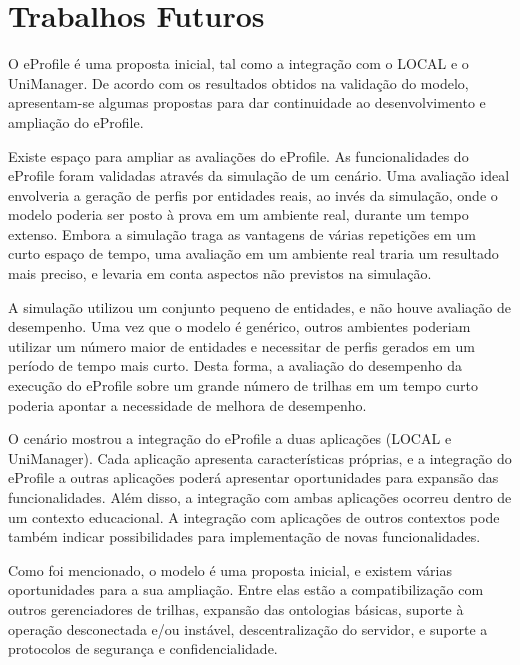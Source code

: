 \section{Trabalhos Futuros}

O eProfile é uma proposta inicial, tal como a integração com o LOCAL e o UniManager. De acordo com os resultados obtidos na validação do modelo, apresentam-se algumas propostas para dar continuidade ao desenvolvimento e ampliação do eProfile.

Existe espaço para ampliar as avaliações do eProfile. As funcionalidades do eProfile foram validadas através da simulação de um cenário. Uma avaliação ideal envolveria a geração de perfis por entidades reais, ao invés da simulação, onde o modelo poderia ser posto à prova em um ambiente real, durante um tempo extenso. Embora a simulação traga as vantagens de várias repetições em um curto espaço de tempo, uma avaliação em um ambiente real traria um resultado mais preciso, e levaria em conta aspectos não previstos na simulação.

A simulação utilizou um conjunto pequeno de entidades, e não houve avaliação de desempenho. Uma vez que o modelo é genérico, outros ambientes poderiam utilizar um número maior de entidades e necessitar de perfis gerados em um período de tempo mais curto. Desta forma, a avaliação do desempenho da execução do eProfile sobre um grande número de trilhas em um tempo curto poderia apontar a necessidade de melhora de desempenho.

O cenário mostrou a integração do eProfile a duas aplicações (LOCAL e UniManager). Cada aplicação apresenta características próprias, e a integração do eProfile a outras aplicações poderá apresentar oportunidades para expansão das funcionalidades. Além disso, a integração com ambas aplicações ocorreu dentro de um contexto educacional. A integração com aplicações de outros contextos pode também indicar possibilidades para implementação de novas funcionalidades.

Como foi mencionado, o modelo é uma proposta inicial, e existem várias oportunidades para a sua ampliação. Entre elas estão a compatibilização com outros gerenciadores de trilhas, expansão das ontologias básicas, suporte à operação desconectada e/ou instável, descentralização do servidor, e suporte a protocolos de segurança e confidencialidade.

